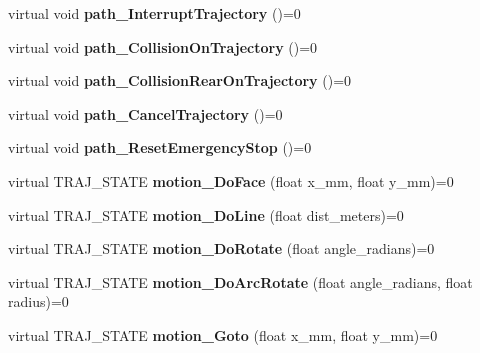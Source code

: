\begin{DoxyCompactItemize}
virtual void {\bfseries path\+\_\+\+Interrupt\+Trajectory} ()=0
\item 
\mbox{\label{classAAsservDriver_a0faec2325a4b8e159bbccc28ddb4eba0}} 
virtual void {\bfseries path\+\_\+\+Collision\+On\+Trajectory} ()=0
\item 
\mbox{\label{classAAsservDriver_a46391c5413a97747093f0bbe366d16fc}} 
virtual void {\bfseries path\+\_\+\+Collision\+Rear\+On\+Trajectory} ()=0
\item 
\mbox{\label{classAAsservDriver_a5bc22cc735af0982a4c7a4d6fbe19c4f}} 
virtual void {\bfseries path\+\_\+\+Cancel\+Trajectory} ()=0
\item 
\mbox{\label{classAAsservDriver_a55e3b442898d83f302b9d9e0898317b6}} 
virtual void {\bfseries path\+\_\+\+Reset\+Emergency\+Stop} ()=0
\item 
\mbox{\label{classAAsservDriver_a1a20a75bd63b75ecaf511e824a8a796a}} 
virtual T\+R\+A\+J\+\_\+\+S\+T\+A\+TE {\bfseries motion\+\_\+\+Do\+Face} (float x\+\_\+mm, float y\+\_\+mm)=0
\item 
\mbox{\label{classAAsservDriver_a9a605eb37c55384962093a200a512bad}} 
virtual T\+R\+A\+J\+\_\+\+S\+T\+A\+TE {\bfseries motion\+\_\+\+Do\+Line} (float dist\+\_\+meters)=0
\item 
\mbox{\label{classAAsservDriver_a2211748fb68a1431096c17ba4f9d7c42}} 
virtual T\+R\+A\+J\+\_\+\+S\+T\+A\+TE {\bfseries motion\+\_\+\+Do\+Rotate} (float angle\+\_\+radians)=0
\item 
\mbox{\label{classAAsservDriver_a3c41681cce40f67e84af3ad973281913}} 
virtual T\+R\+A\+J\+\_\+\+S\+T\+A\+TE {\bfseries motion\+\_\+\+Do\+Arc\+Rotate} (float angle\+\_\+radians, float radius)=0
\item 
\mbox{\label{classAAsservDriver_ac62c5066c309e395a63a155f78053c9e}} 
virtual T\+R\+A\+J\+\_\+\+S\+T\+A\+TE {\bfseries motion\+\_\+\+Goto} (float x\+\_\+mm, float y\+\_\+mm)=0
\item 
\mbox{\label{classAAsservDriver_a19b77ce59325a7c6c5f65eac3d9c7593}} 

\end{DoxyCompactItemize}
